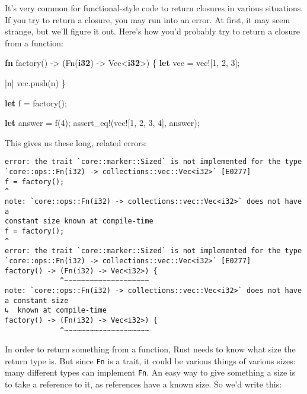 \documentclass[a4paper,]{book}
\newenvironment{Shaded}{\begin{snugshade}}{\end{snugshade}}
\newcommand{\KeywordTok}[1]{\textcolor[rgb]{0.13,0.29,0.53}{\textbf{{#1}}}}
\newcommand{\DecValTok}[1]{\textcolor[rgb]{0.00,0.00,0.81}{{#1}}}
\newcommand{\OtherTok}[1]{\textcolor[rgb]{0.56,0.35,0.01}{{#1}}}
\newcommand{\NormalTok}[1]{{#1}}
\begin{document}
It's very common for functional-style code to return closures in various
situations. If you try to return a closure, you may run into an error.
At first, it may seem strange, but we'll figure it out. Here's how you'd
probably try to return a closure from a function:

\begin{Shaded}
\begin{Highlighting}[]
\KeywordTok{fn} \NormalTok{factory() -> (Fn(}\KeywordTok{i32}\NormalTok{) -> Vec<}\KeywordTok{i32}\NormalTok{>) \{}
    \KeywordTok{let} \NormalTok{vec = }\OtherTok{vec!}\NormalTok{[}\DecValTok{1}\NormalTok{, }\DecValTok{2}\NormalTok{, }\DecValTok{3}\NormalTok{];}

    \NormalTok{|n| vec.push(n)}
\NormalTok{\}}

\KeywordTok{let} \NormalTok{f = factory();}

\KeywordTok{let} \NormalTok{answer = f(}\DecValTok{4}\NormalTok{);}
\OtherTok{assert_eq!}\NormalTok{(}\OtherTok{vec!}\NormalTok{[}\DecValTok{1}\NormalTok{, }\DecValTok{2}\NormalTok{, }\DecValTok{3}\NormalTok{, }\DecValTok{4}\NormalTok{], answer);}
\end{Highlighting}
\end{Shaded}

This gives us these long, related errors:

\begin{verbatim}
error: the trait `core::marker::Sized` is not implemented for the type
`core::ops::Fn(i32) -> collections::vec::Vec<i32>` [E0277]
f = factory();
^
note: `core::ops::Fn(i32) -> collections::vec::Vec<i32>` does not have a
constant size known at compile-time
f = factory();
^
error: the trait `core::marker::Sized` is not implemented for the type
`core::ops::Fn(i32) -> collections::vec::Vec<i32>` [E0277]
factory() -> (Fn(i32) -> Vec<i32>) {
             ^~~~~~~~~~~~~~~~~~~~~
note: `core::ops::Fn(i32) -> collections::vec::Vec<i32>` does not have a constant size
↳  known at compile-time
factory() -> (Fn(i32) -> Vec<i32>) {
             ^~~~~~~~~~~~~~~~~~~~~
\end{verbatim}

In order to return something from a function, Rust needs to know what
size the return type is. But since \texttt{Fn} is a trait, it could be
various things of various sizes: many different types can implement
\texttt{Fn}. An easy way to give something a size is to take a reference
to it, as references have a known size. So we'd write this:
\end{document}
